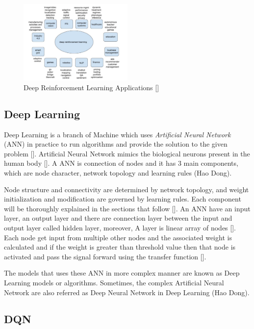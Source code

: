 \documentclass[12pt]{article}
\begin{document}
\begin{figure}[H]
\centering
  \includegraphics[width=0.5\textwidth]{images/drl-imp.png}
  \caption{Deep Reinforcement Learning Applications [\cite{yuxi}]}
  \label{drl-imp}
\end{figure}

\subsection{Deep Learning}

Deep Learning is a branch of Machine which uses \textit{Artificial Neural Network} (ANN) in practice to run algorithms and provide the solution to the given problem [\cite{laura}]. Artificial Neural Network mimics the biological neurons present in the human body [\cite{laura}]. A ANN is connection of nodes and it has 3 main components,  which are node character, network topology and learning rules (Hao Dong).

Node structure and connectivity are determined by network topology, and weight initialization and modification are governed by learning rules. Each component will be thoroughly explained in the sections that follow [\cite{Zou_Han_So_2008}]. An ANN have an input layer, an output layer and there are connection layer between the input and output layer called hidden layer, moreover, A layer is linear array of nodes [\cite{Zou_Han_So_2008}]. Each node get input from multiple other nodes and the associated weight is calculated and if the weight is greater than threshold value then that node is activated and pass the signal forward using the transfer function [\cite{Zou_Han_So_2008}].

The models that uses these ANN in more complex manner are known as Deep Learning models or algorithms. Sometimes, the complex Artificial Neural Network are also referred as Deep Neural Network in Deep Learning (Hao Dong).


\subsection{DQN}
\end{document}
